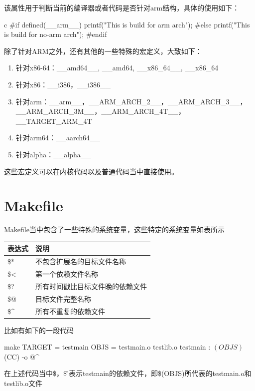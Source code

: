 \begin{outline}[enumerate]
该属性用于判断当前的编译器或者代码是否针对arm结构，具体的使用如下：
\begin{code-in-enumerate}{c}
#if defined(__arm__)
        printf("This is build for arm arch\n");
#else
        printf("This is build for no-arm arch\n");
#endif
\end{code-in-enumerate}
除了针对ARM之外，还有其他的一些特殊的宏定义，大致如下：
\begin{enumerate}
  \item 针对x86-64：\_\_amd64\_\_, \_\_amd64, \_\_x86\_64\_\_, \_\_x86\_64
  \item 针对x86：\_\_i386，\_\_i386\_\_
  \item 针对arm：\_\_arm\_\_，\_\_ARM\_ARCH\_2\_\_，\_\_ARM\_ARCH\_3\_\_，\_\_ARM\_ARCH\_3M\_\_，\_\_ARM\_ARCH\_4T\_\_，\_\_TARGET\_ARM\_4T
  \item 针对arm64：\_\_aarch64\_\_
  \item 针对alpha：\_\_alpha\_\_
\end{enumerate}
这些宏定义可以在内核代码以及普通代码当中直接使用。

\end{outline}

\section{Makefile}
Makefile当中包含了一些特殊的系统变量，这些特定的系统变量如表所示
\begin{center}
  \begin{tabularx}{\textwidth}{|X|X|}
  \hline
  表达式& 说明\\ \hline
  \$* & 不包含扩展名的目标文件名称 \\
  \$< & 第一个依赖文件名称\\
  \$? & 所有时间戳比目标文件晚的依赖文件\\
  \$@ & 目标文件完整名称\\
  \$\^{} & 所有不重复的依赖文件\\ \hline
  \end{tabularx}
  \label{tab:macro_of_makefile}
\end{center}

比如有如下的一段代码
\begin{code-block}{make}
TARGET = testmain
OBJS = testmain.o testlib.o
testmain : $(OBJS)
        $(CC) -o $@ $^
\end{code-block}

在上述代码当中\$，\$\^则表示testmain的依赖文件，即\$(OBJS)所代表的testmain.o和testlib.o文件

